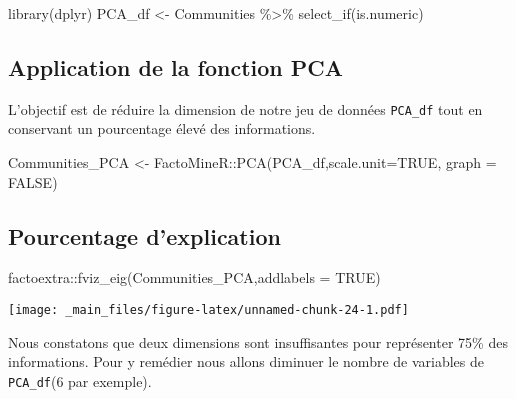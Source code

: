 \documentclass[
]{book}
\newenvironment{Shaded}{\begin{snugshade}}{\end{snugshade}}
\newcommand{\AttributeTok}[1]{\textcolor[rgb]{0.77,0.63,0.00}{#1}}
\newcommand{\ConstantTok}[1]{\textcolor[rgb]{0.00,0.00,0.00}{#1}}
\newcommand{\FunctionTok}[1]{\textcolor[rgb]{0.00,0.00,0.00}{#1}}
\newcommand{\NormalTok}[1]{#1}
\newcommand{\OtherTok}[1]{\textcolor[rgb]{0.56,0.35,0.01}{#1}}
\newcommand{\SpecialCharTok}[1]{\textcolor[rgb]{0.00,0.00,0.00}{#1}}
\begin{document}
\begin{Shaded}
\begin{Highlighting}[]
\FunctionTok{library}\NormalTok{(dplyr)}
\NormalTok{PCA\_df }\OtherTok{\textless{}{-}}\NormalTok{ Communities }\SpecialCharTok{\%\textgreater{}\%} \FunctionTok{select\_if}\NormalTok{(is.numeric)}
\end{Highlighting}
\end{Shaded}

\hypertarget{application-de-la-fonction-pca}{%
\subsection*{Application de la fonction PCA}\label{application-de-la-fonction-pca}}

L'objectif est de réduire la dimension de notre jeu de données \texttt{PCA\_df} tout en conservant un pourcentage élevé des informations.

\begin{Shaded}
\begin{Highlighting}[]
\NormalTok{Communities\_PCA }\OtherTok{\textless{}{-}}\NormalTok{ FactoMineR}\SpecialCharTok{::}\FunctionTok{PCA}\NormalTok{(PCA\_df,}\AttributeTok{scale.unit=}\ConstantTok{TRUE}\NormalTok{,}
                                   \AttributeTok{graph =} \ConstantTok{FALSE}\NormalTok{)}
\end{Highlighting}
\end{Shaded}

\hypertarget{pourcentage-dexplication}{%
\subsection*{Pourcentage d'explication}\label{pourcentage-dexplication}}

\begin{Shaded}
\begin{Highlighting}[]
\NormalTok{factoextra}\SpecialCharTok{::}\FunctionTok{fviz\_eig}\NormalTok{(Communities\_PCA,}\AttributeTok{addlabels =} \ConstantTok{TRUE}\NormalTok{)}
\end{Highlighting}
\end{Shaded}

\texttt{[image: \_main\_files/figure-latex/unnamed-chunk-24-1.pdf]}

Nous constatons que deux dimensions sont insuffisantes pour représenter 75\% des informations. Pour y remédier nous allons diminuer le nombre de variables de \texttt{PCA\_df}(6 par exemple).
\end{document}
